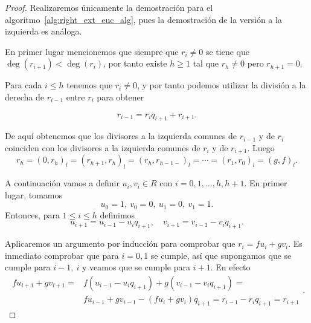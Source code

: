 \begin{proof}
    Realizaremos únicamente la demostración para el algoritmo~\ref{alg:right_ext_euc_alg}, pues la demostración de la versión a la izquierda es análoga.

    En primer lugar mencionemos que siempre que \(r_i \neq 0\) se tiene que \(\deg(r_{i+1}) < \deg(r_i)\), por tanto existe  \(h \geq 1\) tal que \(r_h \neq 0\) pero \(r_{h+1} = 0\).

Para cada \(i \leq h\) tenemos que \(r_i \neq 0\), y por tanto podemos utilizar la división a la derecha de \(r_{i-1}\) entre \(r_i\) para obtener

\[
r_{i-1} = r_i q_{i+1} + r_{i+1}
.\]

De aquí obtenemos que los divisores a la izquierda comunes de \(r_{i-1}\) y de \(r_i\) coinciden con los divisores a la izquierda comunes de  \(r_i\) y de  \(r_{i+1}\). Luego
\[
r_h = (0, r_h)_l = (r_{h+1}, r_h)_l = (r_h, r_{h-1-})_l = \cdots = (r_1, r_0)_l = (g,f)_l
.\]

A continuación vamos a definir \(u_i, v_i \in R\) con \(i = 0,1, \dots, h, h+1\). En primer lugar, tomamos
\[
u_0 = 1,\ v_0 = 0,\ u_1 = 0,\ v_1 = 1
.\]
Entonces, para \(1 \leq i \leq h\) definimos
\[
u_{i+1} = u_{i-1} - u_iq_{i+1}, \quad
v_{i+1} = v_{i-1} - v_iq_{i+1}
.\]

Aplicaremos un argumento por inducción para comprobar que \(r_i = fu_i + gv_i\). Es inmediato comprobar que para \(i = 0,1\) se cumple, así que supongamos que se cumple para \(i-1,\ i\) y veamos que se cumple para \(i+1\). En efecto
\[
\begin{aligned}
f u_{i+1} + g v_{i+1} =& f(u_{i-1} - u_iq_{i+1}) + g(v_{i-1} - v_iq_{i+1}) = \\
&f u_{i-1} + g v_{i-1} - (f u_i + g v_i)q_{i+1} = r_{i-1} - r_iq_{i+1} = r_{i+1}
\end{aligned}
.\]


\end{proof}
